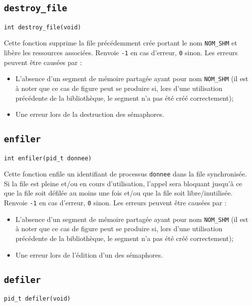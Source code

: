 \documentclass[12pt]{article}
\begin{document}
\subsection{\texttt{destroy\_file}}
\begin{center}
    \texttt{int destroy\_file(void)}
\end{center}

Cette fonction supprime la file précédemment crée portant le nom
\texttt{NOM\_SHM} et libère les ressources associées.
Renvoie \texttt{-1} en cas d'erreur, \texttt{0} sinon. Les erreurs peuvent
être causées par :
\begin{itemize}
    \item L'absence d'un segment de mémoire partagée ayant pour nom
          \texttt{NOM\_SHM} (il est à noter que ce cas de figure peut se produire si,
          lors d'une utilisation précédente de la bibliothèque, le segment n'a pas été
          créé correctement);
    \item Une erreur lors de la destruction des sémaphores.
\end{itemize}

\subsection{\texttt{enfiler}}
\begin{center}
    \texttt{int enfiler(pid\_t donnee)}
\end{center}

Cette fonction enfile un identifiant de processus \texttt{donnee} dans la
file synchronisée. Si la file est pleine et/ou en cours d'utilisation, l'appel
sera bloquant jusqu'à ce que la file soit défilée au moins une fois et/ou que
la file soit libre/inutilisée.
Renvoie \texttt{-1} en cas d'erreur, \texttt{0} sinon. Les erreurs peuvent
être causées par :
\begin{itemize}
    \item L'absence d'un segment de mémoire partagée ayant pour nom
          \texttt{NOM\_SHM} (il est à noter que ce cas de figure peut se produire si,
          lors d'une utilisation précédente de la bibliothèque, le segment n'a pas été
          créé correctement);
    \item Une erreur lors de l'édition d'un des sémaphores.
\end{itemize}

\subsection{\texttt{defiler}}
\begin{center}
    \texttt{pid\_t defiler(void)}
\end{center}
\end{document}
